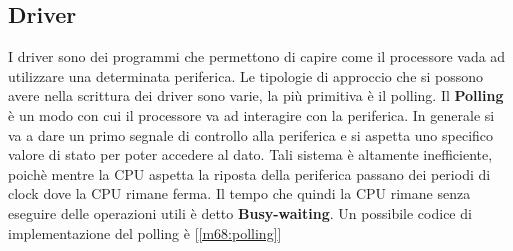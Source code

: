 \subsection{Driver}
I driver sono dei programmi che permettono di capire come il processore vada ad utilizzare una determinata periferica.
Le tipologie di approccio che si possono avere nella scrittura dei driver sono varie, la più primitiva è il polling.
Il \textbf{Polling} è un modo con cui il processore va ad interagire con la periferica. In generale si va a dare un primo segnale di controllo alla periferica e si aspetta uno specifico valore di stato per poter accedere al dato. Tali sistema è altamente inefficiente, poichè mentre la CPU aspetta la riposta della periferica passano dei periodi di clock dove la CPU rimane ferma. Il tempo che quindi la CPU rimane senza eseguire delle operazioni utili è detto \textbf{Busy-waiting}. Un possibile codice di implementazione del polling è [\ref{m68:polling}]

